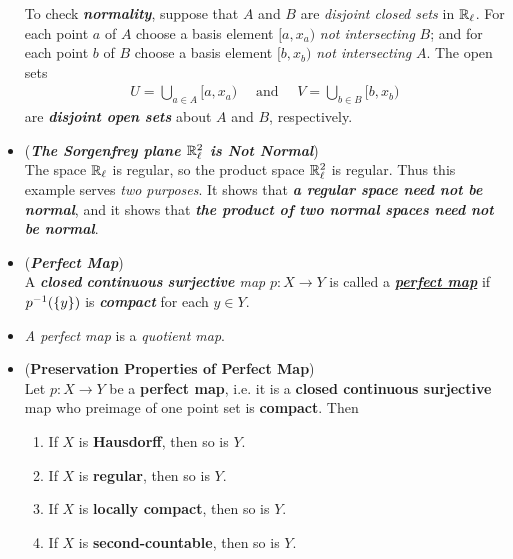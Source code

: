 \documentclass[11pt]{article}
\begin{document}
\begin{itemize}
\begin{example}
To check \emph{\textbf{normality}}, suppose that $A$ and $B$ are \emph{disjoint closed sets} in ${\mathbb R}_{\ell}$. For each point $a$ of $A$ choose a basis element $[a, x_a)$ \emph{not intersecting} $B$; and for each point $b$ of $B$ choose a basis element $[b, x_b)$ \emph{not intersecting} $A$.
The open sets
\begin{align*}
U = \bigcup_{a\in A}[a, x_a)\quad \text{ and }\quad V = \bigcup_{b \in B}[b, x_b)
\end{align*}
are \emph{\textbf{disjoint open sets}} about $A$ and $B$, respectively.
\end{example}

\item \begin{example} (\emph{\textbf{The Sorgenfrey plane ${\mathbb R}_{\ell}^2$ is Not Normal}})\\
The space ${\mathbb R}_{\ell}$ is regular, so the product space ${\mathbb R}_{\ell}^2$ is regular. Thus this example serves \emph{two purposes}. It shows that \emph{\textbf{a regular space need not be normal}}, and it shows that \emph{\textbf{the product of two normal spaces need not be normal}}.
\end{example}

\item \begin{definition} (\emph{\textbf{Perfect Map}})\\
A \emph{\textbf{closed} \textbf{continuous} \textbf{surjective} map} $p : X \rightarrow Y$ is called a \underline{\emph{\textbf{perfect map}}} if $p^{-1}(\left\{y\right\})$ is
\emph{\textbf{compact}} for each $y \in Y$.
\end{definition}

\item \begin{remark}
\emph{A perfect map} is a \emph{quotient map}.
\end{remark}

\item \begin{proposition}  (\textbf{Preservation Properties of Perfect Map}) \citep{munkres2000topology}\\
Let $p : X \rightarrow Y$ be a \textbf{perfect map}, i.e. it is a \textbf{closed continuous surjective} map who preimage of one point set is \textbf{compact}. Then
\begin{enumerate}
\item If $X$ is \textbf{Hausdorff}, then so is $Y$.
\item If $X$ is \textbf{regular}, then so is $Y$.
\item If $X$ is \textbf{locally compact}, then so is $Y$.
\item If $X$ is \textbf{second-countable}, then so is $Y$.
\end{enumerate}
\end{proposition}


\end{itemize}
\end{document}

